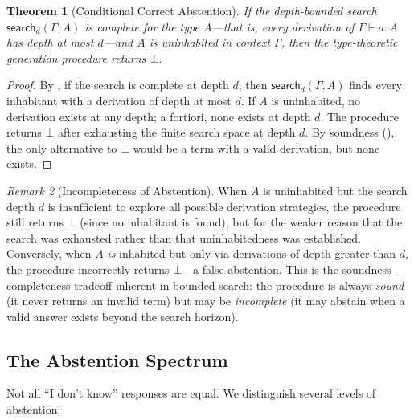 \documentclass[11pt,a4paper]{article}
\theoremstyle{plain}
\newtheorem{theorem}{Theorem}[section]
\theoremstyle{definition}
\theoremstyle{remark}
\newtheorem{remark}[theorem]{Remark}
\begin{document}
\begin{theorem}[Conditional Correct Abstention]\label{thm:abstention}
If the depth-bounded search $\mathsf{search}_d(\Gamma, A)$ is \emph{complete} for the type $A$---that is, every derivation of $\Gamma \vdash a : A$ has depth at most $d$---and $A$ is uninhabited in context $\Gamma$, then the type-theoretic generation procedure returns $\bot$.
\end{theorem}

\begin{proof}
By , if the search is complete at depth $d$, then $\mathsf{search}_d(\Gamma, A)$ finds every inhabitant with a derivation of depth at most $d$.
If $A$ is uninhabited, no derivation exists at any depth; a fortiori, none exists at depth $d$.
The procedure returns $\bot$ after exhausting the finite search space at depth $d$.
By soundness (), the only alternative to $\bot$ would be a term with a valid derivation, but none exists.
\end{proof}

\begin{remark}[Incompleteness of Abstention]\label{rem:abstention-incomplete}
When $A$ is uninhabited but the search depth $d$ is insufficient to explore all possible derivation strategies, the procedure still returns $\bot$ (since no inhabitant is found), but for the weaker reason that the search was exhausted rather than that uninhabitedness was established.
Conversely, when $A$ \emph{is} inhabited but only via derivations of depth greater than $d$, the procedure incorrectly returns $\bot$---a false abstention.
This is the soundness--completeness tradeoff inherent in bounded search: the procedure is always \emph{sound} (it never returns an invalid term) but may be \emph{incomplete} (it may abstain when a valid answer exists beyond the search horizon).
\end{remark}

\subsection{The Abstention Spectrum}

Not all ``I don't know'' responses are equal.
We distinguish several levels of abstention:
\end{document}
